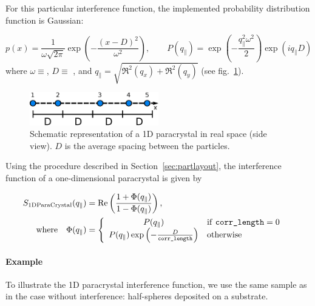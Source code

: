 For this particular interference function, the implemented probability distribution function is Gaussian:

\begin{equation*}
p(x)=\frac{1}{\omega \sqrt{2\pi}} \exp\left(-\dfrac{(x-D)^2}{\omega^2}\right),\qquad P(q_{\parallel})=\exp\left(-\frac{q_{\parallel}^2 \omega^2}{2}\right)\exp(iq_{\parallel}D)
\end{equation*}
where $\omega\equiv$, $D\equiv$ , and $q_{\parallel}=\sqrt{\Re^2(q_x) + \Re^2(q_y)}$ (see fig.~\ref{fig:1dpara}).

\begin{figure}[h]
\begin{center}
\includegraphics[width=0.5\textwidth]{Figures/1Dparacrystal}
\end{center}
\caption{Schematic representation of a 1D paracrystal in real space (side view). $D$ is the average spacing between the particles.}
\label{fig:1dpara}
\end{figure}

Using the procedure described in Section~\ref{sec:partlayout}, the interference function of a one-dimensional paracrystal is given by

\begin{align*}
S_{\mathrm{1DParaCrystal}}(q_{\parallel}) &=\operatorname{Re} \left(\frac{1+\Phi(q_{\parallel}) }{1 - \Phi(q_{\parallel})} \right), \\
\mathrm{where}\quad \Phi(q_{\parallel}) &= \left\{
\begin{array}{c l}     
    P(q_{\parallel}) & \mathrm{if\ \texttt{corr\_length}}=0\\
    P(q_{\parallel})\exp\left(-\frac{D}{\mathrm{\texttt{corr\_length}}}\right) & \mathrm{otherwise}
\end{array}\right.&
\end{align*}

\paragraph{Example}
To illustrate the 1D paracrystal interference function, we use the same sample as in the case without interference: half-spheres deposited on a substrate.


